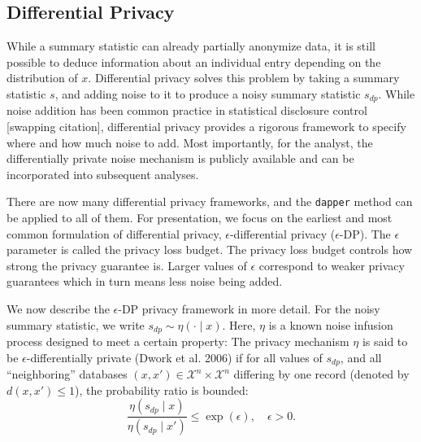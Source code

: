 \hypertarget{differential-privacy}{%
\subsection{Differential Privacy}\label{differential-privacy}}

While a summary statistic can already partially anonymize data, it is still
possible to deduce information about an individual entry depending on
the distribution of \(x\). Differential privacy
solves this problem by taking a summary statistic \(s\), and adding noise to it to produce a noisy summary statistic \(s_{dp}\).
While noise addition has
been common practice in statistical disclosure control {[}swapping citation{]}, differential privacy
provides a rigorous framework to specify where and how much
noise to add. Most importantly, for the analyst, the differentially private noise mechanism is publicly
available and can be incorporated into subsequent analyses.

There are now many differential privacy frameworks, and the \texttt{dapper} method can be applied to
all of them. For presentation, we focus on the earliest and most common
formulation of differential privacy, \(\epsilon\)-differential privacy (\(\epsilon\)-DP). The
\(\epsilon\) parameter is called the privacy loss budget. The privacy loss budget controls how
strong the privacy guarantee is. Larger values of \(\epsilon\) correspond to weaker
privacy guarantees which in turn means less noise being added.

We now describe the \(\epsilon\)-DP privacy framework in more detail. For the noisy summary
statistic, we write \(s_{dp} \sim \eta(\cdot \mid x)\). Here,
\(\eta\) is a known noise infusion process designed to meet a certain property: The privacy mechanism
\(\eta\) is said to be \(\epsilon\)-differentially private (Dwork et al. 2006) if for all values of
\(s_{dp}\), and all ``neighboring'' databases \((x,x') \in \mathcal{X}^n \times \mathcal{X}^n\) differing
by one record (denoted by \(d(x,x') \leq 1\)), the probability ratio is bounded:
\[
\dfrac{\eta(s_{dp} \mid x)}{\eta(s_{dp} \mid x')} \leq \exp(\epsilon), \quad \epsilon > 0.
\]

